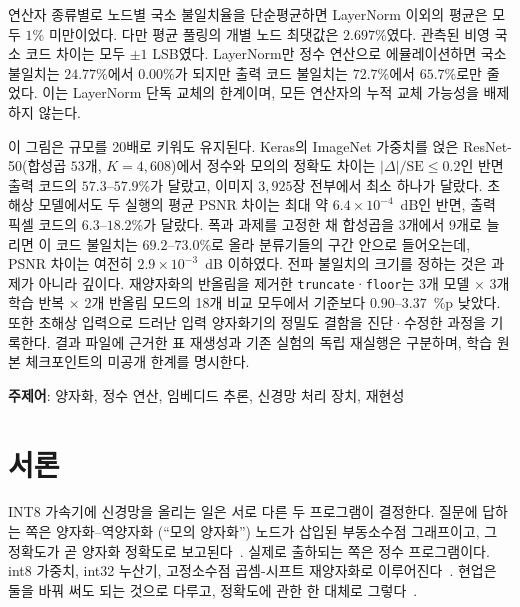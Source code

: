 \documentclass[11pt,a4paper,oneside]{report}
\begin{document}
연산자 종류별로 노드별 국소 불일치율을 단순평균하면 LayerNorm 이외의 평균은 모두
$1\%$ 미만이었다. 다만 평균 풀링의 개별 노드 최댓값은 $2.697\%$였다. 관측된 비영 국소
코드 차이는 모두 $\pm1$ LSB였다. LayerNorm만 정수 연산으로 에뮬레이션하면 국소 불일치는
$24.77\%$에서 $0.00\%$가 되지만 출력 코드 불일치는 $72.7\%$에서 $65.7\%$로만 줄었다.
이는 LayerNorm 단독 교체의 한계이며, 모든 연산자의 누적 교체 가능성을 배제하지 않는다.

이 그림은 규모를 20배로 키워도 유지된다. Keras의 ImageNet 가중치를 얹은 ResNet-50(합성곱 $53$개,
$K = 4{,}608$)에서 정수와 모의의 정확도 차이는 $|\Delta|/\mathrm{SE} \le 0.2$인 반면 출력 코드의
$57.3$--$57.9\%$가 달랐고, 이미지 $3{,}925$장 전부에서 최소 하나가 달랐다.
초해상 모델에서도 두 실행의 평균 PSNR 차이는 최대 약 $6.4\times10^{-4}$~dB인 반면,
출력 픽셀 코드의 $6.3$--$18.2\%$가 달랐다. 폭과 과제를 고정한 채 합성곱을 3개에서 9개로 늘리면
이 코드 불일치는 $69.2$--$73.0\%$로 올라 분류기들의 구간 안으로 들어오는데, PSNR 차이는 여전히
$2.9\times10^{-3}$~dB 이하였다. 전파 불일치의 크기를 정하는 것은 과제가 아니라 깊이다.
재양자화의 반올림을 제거한
\texttt{truncate}·\texttt{floor}는 3개 모델 × 3개 학습 반복 × 2개 반올림 모드의
18개 비교 모두에서 기준보다 $0.90$--$3.37$~\%p 낮았다. 또한 초해상 입력으로 드러난
입력 양자화기의 정밀도 결함을 진단·수정한 과정을 기록한다. 결과 파일에 근거한 표 재생성과
기존 실험의 독립 재실행은 구분하며, 학습 원본 체크포인트의 미공개 한계를 명시한다.

\bigskip
\noindent\textbf{주제어}: 양자화, 정수 연산, 임베디드 추론, 신경망 처리 장치, 재현성

\tableofcontents
\listoffigures
\listoftables

\clearpage
{}
\setcounter{page}{1}

\chapter{서론}

INT8 가속기에 신경망을 올리는 일은 서로 다른 두 프로그램이 결정한다. 질문에 답하는 쪽은 양자화--역양자화
(``모의 양자화'') 노드가 삽입된 부동소수점 그래프이고, 그 정확도가 곧 양자화 정확도로
보고된다~\cite{jacob2018,krishnamoorthi2018}. 실제로 출하되는 쪽은 정수 프로그램이다. int8 가중치, int32
누산기, 고정소수점 곱셈-시프트 재양자화로 이루어진다~\cite{gemmlowp}. 현업은 둘을 바꿔 써도 되는 것으로
다루고, 정확도에 관한 한 대체로 그렇다~\cite{nagel2021}.
\end{document}
